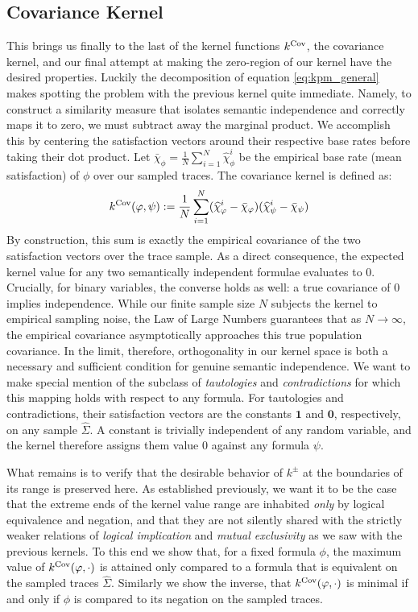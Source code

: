 \documentclass[titlepage,a4paper,11pt]{report}
\begin{document}
    \subsection{Covariance Kernel}
    This brings us finally to the last of the kernel functions $k^{\mathrm{Cov}}$, the covariance kernel, and our final attempt at making  the zero-region of our kernel have the desired properties. Luckily the decomposition of equation \eqref{eq:kpm_general} makes spotting the problem with the previous kernel quite immediate. Namely, to construct a similarity measure that isolates semantic independence and correctly maps it to zero, we must subtract away the marginal product. We accomplish this by centering the satisfaction vectors around their respective base rates before taking their dot product. Let $\bar{\chi}_\phi = \frac{1}{N}\sum_{i=1}^N \widehat{\chi}^i_\phi$ be the empirical base rate (mean satisfaction) of $\phi$ over our sampled traces. The covariance kernel is defined as:
    \begin{equation}\label{eq:covariance_kernel}
        k^{\mathrm{Cov}}(\varphi, \psi) := \frac{1}{N} \sum_{i=1}^N (\widehat{\chi}^i_\varphi - \bar{\chi}_\varphi) (\widehat{\chi}^i_\psi - \bar{\chi}_\psi)
    \end{equation}
    By construction, this sum is exactly the empirical covariance of the two satisfaction vectors over the trace sample. As a direct consequence, the expected kernel value for any two semantically independent formulae evaluates to $0$. Crucially, for binary variables, the converse holds as well: a true covariance of $0$ implies independence. While our finite sample size $N$ subjects the kernel to empirical sampling noise, the Law of Large Numbers guarantees that as $N \to \infty$, the empirical covariance asymptotically approaches this true population covariance. In the limit, therefore, orthogonality in our kernel space is both a necessary and sufficient condition for genuine semantic independence. We want to make special mention of the subclass of \textit{tautologies} and \textit{contradictions} for which this mapping holds with respect to any formula. For tautologies and contradictions, their satisfaction vectors are the constants $\mathbf{1}$ and $\mathbf{0}$, respectively, on any sample $\widehat\Sigma$. A constant is trivially independent of any random variable, and the kernel therefore assigns them value $0$ against any formula $\psi$.
    
    What remains is to verify that the desirable behavior of $k^\pm$ at the boundaries of its range is preserved here. As established previously, we want it to be the case that the extreme ends of the kernel value range are inhabited \emph{only} by logical equivalence and negation, and that they are not silently shared with the strictly weaker relations of \emph{logical implication} and \emph{mutual exclusivity} as we saw with the previous kernels. To this end we show that, for a fixed formula $\phi$, the maximum value of $k^{\mathrm{Cov}}(\varphi,\cdot)$ is attained only compared to a formula that is equivalent on the sampled traces $\widehat \Sigma$. Similarly we show the inverse, that $k^{\mathrm{Cov}}(\varphi,\cdot)$ is minimal if and only if $\phi$ is compared to its negation on the sampled traces.
\end{document}
